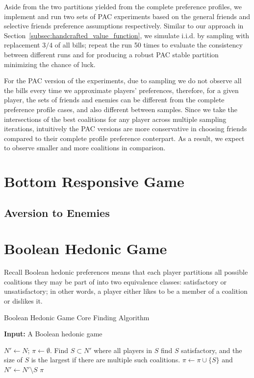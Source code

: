 Aside from the two partitions yielded from the complete preference profiles,
we implement and run two sets of PAC experiments based on the general friends
and selective friends preference assumptions respectively.
Similar to our approach in Section~\ref{subsec:handcrafted_value_function},
we simulate i.i.d. by sampling with replacement $3/4$ of all bills;
repeat the run 50 times to evaluate the consistency between different runs and
for producing a robust PAC stable partition minimizing the chance of luck.

For the PAC version of the experiments, due to sampling we do not observe all
the bills every time we approximate players' preferences,
therefore, for a given player, the sets of friends and enemies can be different
from the complete preference profile cases, and also different between samples.
Since we take the intersections of the best coalitions for any player across
multiple sampling iterations, intuitively the PAC versions are more conservative
in choosing friends compared to their complete profile preference conterpart.
As a result, we expect to observe smaller and more coalitions in comparison.


\section{Bottom Responsive Game}
\label{sec:bottom_responsive_game}

\subsection{Aversion to Enemies}
\label{subsec:aversion_to_enemies}

\section{Boolean Hedonic Game}
\label{sec:boolean_hedonic_game}

Recall Boolean hedonic preferences means that each player partitions all possible
coalitions they may be part of into two equivalence classes:
satisfactory or unsatisfactory; in other words, a player either likes to be
a member of a coalition or dislikes it.

\begin{algorithm}[htb]
  \caption{Boolean Hedonic Game Core Finding Algorithm}
  \label{alg:boolean_core}
  \textbf{Input:} A Boolean hedonic game
  \begin{algorithmic}[1]

  \State $N' \leftarrow N$; $\pi \leftarrow \emptyset$.
    \State Find $S \subset N'$ where all players in $S$ find $S$ satisfactory, and the size of $S$ is the largest if there are multiple such coalitions.
    \State $\pi \leftarrow \pi \cup \lbrace S \rbrace$ and $N' \leftarrow  N' \setminus S$
  \EndWhile
  \State \Return $\pi$

  \end{algorithmic}
\end{algorithm}
